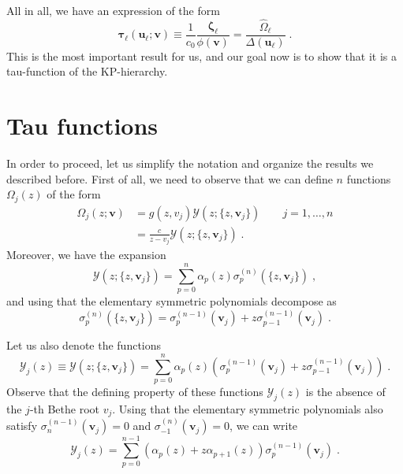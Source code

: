 \documentclass[a4paper,12pt]{amsart}
\begin{document}
All in all, we have an expression of the form
\begin{equation}
  \label{eq:slavnov-tau}
  \bm{\tau}_\ell(\bm{u}_\ell; \bm{v}) \equiv \frac{1}{c_0}\frac{\bm{\zeta}_\ell}{\phi(\bm{v})}
  = \frac{\hat{\Omega}_{\ell}}{\Delta(\bm{u}_\ell)} \; .
\end{equation}
This is the most important result for us, and our goal now is to show
that it is a tau-function of the KP-hierarchy.


\section{Tau functions}

In order to proceed, let us simplify the notation and organize the
results we described before. First of all, we need to observe
that we can define \(n\) functions \(\Omega_j(z)\) of the form
\begin{equation}
\begin{split}
  \Omega_{j}(z; \bm{v}) & = g(z, v_j) \mathcal{Y}(z; \{z, \bm{v}_j\})\qquad j =1, \dots, n\\
   & = \frac{c}{z - v_j} \mathcal{Y}(z; \{z, \bm{v}_j\})\; .
\end{split}
\end{equation}
Moreover, we have the expansion 
\begin{equation}
  \mathcal{Y}(z; \{z,\bm{v}_j\}) = \sum_{p=0}^n \alpha_p(z) \sigma_p^{(n)}(\{z,\bm{v}_j\})\; , 
\end{equation}
and using that the elementary symmetric polynomials decompose as
\begin{equation}
  \sigma_p^{(n)}(\{z,\bm{v}_j\}) = \sigma_p^{(n-1)}(\bm{v}_j) + z \sigma_{p-1}^{(n-1)}(\bm{v}_j) \; . 
\end{equation}

Let us also denote the functions
\begin{equation}
  \label{eq:y-functions-alpha}
  \mathcal{Y}_j(z)  \equiv  \mathcal{Y}(z; \{z,\bm{v}_j\})  = 
\sum_{p=0}^{n} \alpha_p(z)
  \left(\sigma_p^{(n-1)}(\bm{v}_j) + z \sigma_{p-1}^{(n-1)}(\bm{v}_j) \right) \; .
\end{equation}
Observe that the defining property of these functions
\(\mathcal{Y}_j(z)\) is the absence of the \(j\)-th Bethe root
\(v_j\).
Using that the elementary symmetric polynomials also satisfy \(\sigma_n^{(n-1)}(\bm{v}_j)=0\)
and \(\sigma_{-1}^{(n)}(\bm{v}_j)= 0\), we can write
\begin{equation}
  \label{eq:y-functions}
  \mathcal{Y}_j(z)  = 
  \sum_{p=0}^{n-1} 
   \left(\alpha_p(z) + z \alpha_{p+1}(z) \right) \sigma_p^{(n-1)}(\bm{v}_j) \; .
\end{equation}
\end{document}
